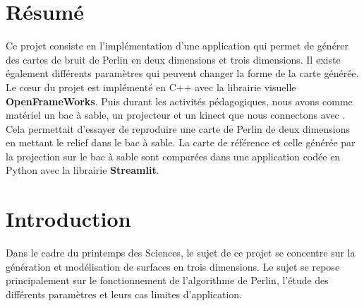 \documentclass{Template}
\begin{document}
\thispagestyle{empty}

\clearpage\pagestyle{plain}

\clearpage\pagestyle{fancy}
\section{Résumé}
Ce projet consiste en l'implémentation d'une application qui permet de générer des cartes de bruit de Perlin en deux dimensions et trois dimensions.
Il existe également différents paramètres qui peuvent changer la forme de la carte générée. 
Le cœur du projet est implémenté en C++ avec la librairie visuelle \textbf{OpenFrameWorks}. 
Puis durant les activités pédagogiques, nous avons comme matériel un bac à sable, un projecteur et un kinect que nous connectons avec \cite{ActivityApplication}. 
Cela permettait d'essayer de reproduire une carte de Perlin de deux dimensions en mettant le relief dans le bac à sable.
La carte de référence et celle générée par la projection sur le bac à sable sont comparées dans une application codée en Python avec la librairie \textbf{Streamlit}.

\section{Introduction}
Dans le cadre du printemps des Sciences, le sujet de ce projet se concentre sur la génération et modélisation de surfaces en trois dimensions.
Le sujet se repose principalement sur le fonctionnement de l'algorithme de Perlin, l'étude des différents paramètres et leurs cas limites d'application. 




\nocite{*}
\printbibliography
\end{document}
